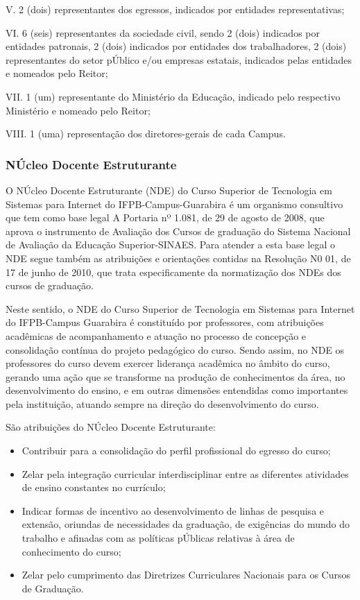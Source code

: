 V.	2 (dois) representantes dos egressos, indicados por entidades representativas;

VI.	6 (seis) representantes da sociedade civil, sendo 2 (dois) indicados por entidades patronais, 2 (dois) indicados por entidades dos trabalhadores, 2 (dois) representantes do setor pÚblico e/ou empresas estatais, indicados pelas entidades e nomeados pelo Reitor;

VII.	1 (um) representante do Ministério da Educação, indicado pelo respectivo Ministério e nomeado pelo Reitor;

VIII.	1 (uma) representação dos diretores-gerais de cada Campus.

\subsubsection{NÚcleo Docente Estruturante}

O NÚcleo Docente Estruturante (NDE) do Curso Superior de Tecnologia em Sistemas para Internet do IFPB-Campus-Guarabira é um organismo consultivo que tem como base legal A Portaria nº 1.081, de 29 de agosto de 2008, que aprova o  instrumento de Avaliação dos Cursos de graduação do Sistema Nacional de Avaliação da Educação Superior-SINAES. Para atender a esta base legal o NDE segue também as atribuições e orientações contidas na Resolução N0 01, de 17 de junho de 2010, que trata especificamente da normatização dos NDEs dos cursos de graduação.

       Neste sentido, o NDE do Curso Superior de Tecnologia em Sistemas para Internet do IFPB-Campus Guarabira é constituído por professores, com atribuições acadêmicas de acompanhamento e atuação no processo de concepção e consolidação contínua do projeto pedagógico do curso. Sendo assim, no NDE os professores do curso devem exercer liderança acadêmica no âmbito do curso, gerando uma ação que se transforme na produção de conhecimentos da área, no desenvolvimento do ensino, e em outras dimensões entendidas como importantes pela instituição, atuando sempre na direção do desenvolvimento do curso. 

 	São atribuições do NÚcleo Docente Estruturante:
 
\begin{itemize}
	\item Contribuir para a consolidação do perfil profissional do egresso do curso; 

	\item Zelar pela integração curricular interdisciplinar entre as diferentes atividades de ensino constantes no currículo; 

	\item Indicar formas de incentivo ao desenvolvimento de linhas de pesquisa e extensão, oriundas de necessidades da graduação, de exigências do mundo do trabalho e afinadas com as políticas pÚblicas relativas à área de conhecimento do curso; 

	\item Zelar pelo cumprimento das Diretrizes Curriculares Nacionais para os Cursos de Graduação. 
\end{itemize}

